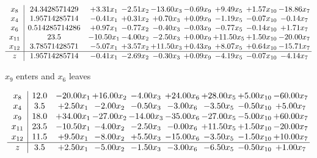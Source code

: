 \documentclass[8pt]{article}
\begin{document}
 \[\begin{array}{c| c c@{\hskip 2pt} c@{\hskip 2pt} c@{\hskip 2pt} c@{\hskip 2pt} c@{\hskip 2pt} c@{\hskip 2pt} c@{\hskip 2pt} }
 x_{8}   &  24.3428571429 & +  3.31 x_{1} & -2.51 x_{2} & -13.60 x_{3} & -0.69 x_{9} & +  9.49 x_{5} & +  1.57 x_{10} & -18.86 x_{7}\\
 x_{4}   &  1.95714285714 & -0.41 x_{1} & +  0.31 x_{2} & +  0.70 x_{3} & +  0.09 x_{9} & -1.19 x_{5} & -0.07 x_{10} & -0.14 x_{7}\\
 x_{6}   &  0.514285714286 & +  0.97 x_{1} & -0.77 x_{2} & -0.40 x_{3} & -0.03 x_{9} & -0.77 x_{5} & -0.14 x_{10} & +  1.71 x_{7}\\
 x_{11}   &  23.5 & -10.50 x_{1} & -4.00 x_{2} & -2.50 x_{3} & +  0.00 x_{9} & + 11.50 x_{5} & +  1.50 x_{10} & -20.00 x_{7}\\
 x_{12}   &  3.78571428571 & -5.07 x_{1} & +  3.57 x_{2} & + 11.50 x_{3} & +  0.43 x_{9} & +  8.07 x_{5} & +  0.64 x_{10} & -15.71 x_{7}\\
\hline
z    &  1.95714285714 & -0.41 x_{1} & -2.69 x_{2} & -0.30 x_{3} & +  0.09 x_{9} & -4.19 x_{5} & -0.07 x_{10} & -4.14 x_{7}\\
\end{array}\]


 $ x_{9} $ enters and $ x_{6} $ leaves 

 \[\begin{array}{c| c c@{\hskip 2pt} c@{\hskip 2pt} c@{\hskip 2pt} c@{\hskip 2pt} c@{\hskip 2pt} c@{\hskip 2pt} c@{\hskip 2pt} }
 x_{8}   &  12.0 & -20.00 x_{1} & + 16.00 x_{2} & -4.00 x_{3} & + 24.00 x_{6} & + 28.00 x_{5} & +  5.00 x_{10} & -60.00 x_{7}\\
 x_{4}   &  3.5 & +  2.50 x_{1} & -2.00 x_{2} & -0.50 x_{3} & -3.00 x_{6} & -3.50 x_{5} & -0.50 x_{10} & +  5.00 x_{7}\\
 x_{9}   &  18.0 & + 34.00 x_{1} & -27.00 x_{2} & -14.00 x_{3} & -35.00 x_{6} & -27.00 x_{5} & -5.00 x_{10} & + 60.00 x_{7}\\
 x_{11}   &  23.5 & -10.50 x_{1} & -4.00 x_{2} & -2.50 x_{3} & -0.00 x_{6} & + 11.50 x_{5} & +  1.50 x_{10} & -20.00 x_{7}\\
 x_{12}   &  11.5 & +  9.50 x_{1} & -8.00 x_{2} & +  5.50 x_{3} & -15.00 x_{6} & -3.50 x_{5} & -1.50 x_{10} & + 10.00 x_{7}\\
\hline
z    &  3.5 & +  2.50 x_{1} & -5.00 x_{2} & -1.50 x_{3} & -3.00 x_{6} & -6.50 x_{5} & -0.50 x_{10} & +  1.00 x_{7}\\
\end{array}\]
\end{document}
